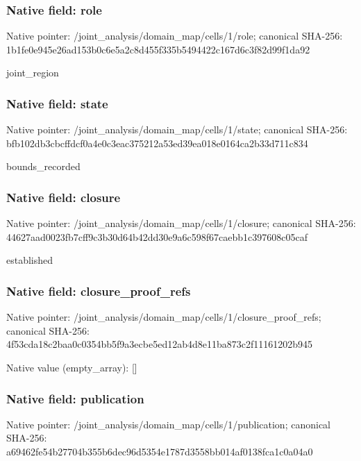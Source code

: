 \documentclass[10pt,a4paper]{article}
\begin{document}
\subsubsection{Native field: role}


Native pointer: /joint\_analysis/domain\_map/cells/1/role; canonical SHA-256: 1b1fe0e945e26ad153b0c6e5\allowbreak{}a2c8d455f335b5494422c167\allowbreak{}d6c3f82d99f1da92


joint\_region


\subsubsection{Native field: state}


Native pointer: /joint\_analysis/domain\_m\allowbreak{}ap/cells/1/state; canonical SHA-256: bfb102db3cbcffdcf0a4e0c3\allowbreak{}eac375212a53ed39ea018e01\allowbreak{}64ca2b33d711c834


bounds\_recorded


\subsubsection{Native field: closure}


Native pointer: /joint\_analysis/domain\_m\allowbreak{}ap/cells/1/closure; canonical SHA-256: 44627aad0023fb7cff9c3b30\allowbreak{}d64b42dd30e9a6c598f67cae\allowbreak{}bb1c397608c05caf


established


\subsubsection{Native field: closure\_proof\_refs}


Native pointer: /joint\_analysis/domain\_m\allowbreak{}ap/cells/1/closure\_proof\allowbreak{}\_refs; canonical SHA-256: 4f53cda18c2baa0c0354bb5f\allowbreak{}9a3ecbe5ed12ab4d8e11ba87\allowbreak{}3c2f11161202b945



Native value (empty\_array): []



\subsubsection{Native field: publication}


Native pointer: /joint\_analysis/domain\_m\allowbreak{}ap/cells/1/publication; canonical SHA-256: a69462fe54b27704b355b6de\allowbreak{}c96d5354e1787d3558bb014a\allowbreak{}f0138fca1c0a04a0
\end{document}
